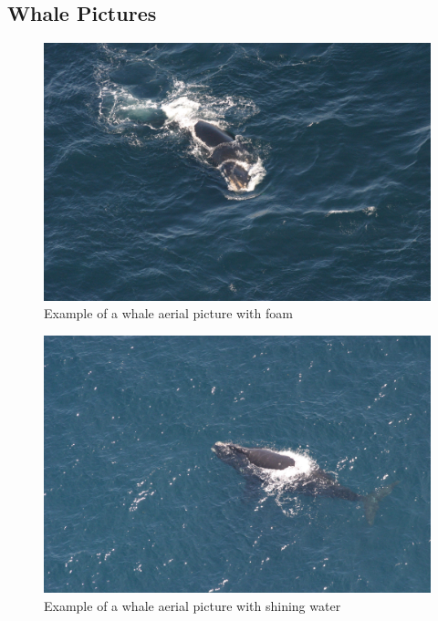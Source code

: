 \documentclass[11pt,a4paper,oneside]{report}
\begin{document}
\begin{appendices}
\chapter*{Whale Pictures}

\begin{figure}
	\centering
	\includegraphics[scale=0.1]{foam.jpg}
	\caption{Example of a whale aerial picture with foam}
\end{figure}

\begin{figure}
	\centering
	\includegraphics[scale=0.15]{water.jpg}
	\caption{Example of a whale aerial picture with shining water}
\end{figure}


\end{appendices}
\end{document}
